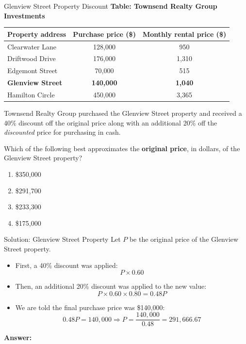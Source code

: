 \documentclass{beamer}
\begin{document}
\begin{frame}{Glenview Street Property Discount}
\small
\textbf{Table: Townsend Realty Group Investments}

\begin{tabular}{|l|c|c|}
\hline
\textbf{Property address} & \textbf{Purchase price (\$)} & \textbf{Monthly rental price (\$)} \\
\hline
Clearwater Lane & 128{,}000 & 950 \\
Driftwood Drive & 176{,}000 & 1{,}310 \\
Edgemont Street & 70{,}000 & 515 \\
\textbf{Glenview Street} & \textbf{140{,}000} & \textbf{1{,}040} \\
Hamilton Circle & 450{,}000 & 3{,}365 \\
\hline
\end{tabular}

\vspace{0.3cm}

Townsend Realty Group purchased the Glenview Street property and received a 40\% discount off the original price along with an additional 20\% off the \textit{discounted} price for purchasing in cash.

\medskip

Which of the following best approximates the \textbf{original price}, in dollars, of the Glenview Street property?

\begin{enumerate}
    \item[A.] \$350{,}000
    \item[B.] \$291{,}700
    \item[C.] \$233{,}300
    \item[D.] \$175{,}000
\end{enumerate}
\end{frame}

\begin{frame}{Solution: Glenview Street Property}
\small
Let $P$ be the original price of the Glenview Street property.

\begin{itemize}
    \item First, a 40\% discount was applied:
    \[
    P \times 0.60
    \]
    \item Then, an additional 20\% discount was applied to the new value:
    \[
    P \times 0.60 \times 0.80 = 0.48P
    \]
    \item We are told the final purchase price was \$140,000:
    \[
    0.48P = 140{,}000
    \Rightarrow P = \frac{140{,}000}{0.48} = 291{,}666.67
    \]
\end{itemize}

\textbf{Answer:} 
\end{frame}
\end{document}
